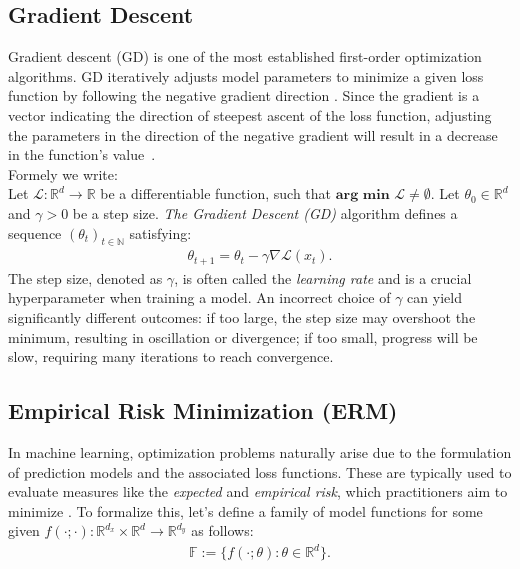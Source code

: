 \subsection{Gradient Descent}
Gradient descent (GD) is one of the most established first-order optimization algorithms. GD iteratively adjusts model
parameters to minimize a given loss function by following the negative gradient direction \cite{toussain2014gradient}.
Since the gradient is a vector indicating the direction of steepest ascent of the loss function, adjusting the parameters in the direction
of the negative gradient will result in a decrease in the function's value~\cite{toussain2014gradient}.\\
Formely we write:\\
\noindent
Let \( \mathcal{L} : \mathbb{R}^d \to \mathbb{R} \) be a differentiable function, such that \(\textbf{arg min } \mathcal{L}  \neq \emptyset \).  
Let \( \theta_0 \in \mathbb{R}^d \) and \( \gamma > 0 \) be a step size.  
\emph{The Gradient Descent (GD)} algorithm defines a sequence \( (\theta_t)_{t \in \mathbb{N}} \) satisfying:
\begin{align}
\theta_{t+1} = \theta_t - \gamma \nabla \mathcal{L}(x_t).
\end{align}
The step size, denoted as $\gamma$, is often called the \emph{learning rate} and is a crucial hyperparameter when training a model.
An incorrect choice of $\gamma$ can yield significantly different outcomes: if too large, the step size may overshoot the minimum, resulting in oscillation or divergence;
if too small, progress will be slow, requiring many iterations to reach convergence. \cite{wu2020wngrad} 


\subsection{Empirical Risk Minimization (ERM)}
\label{sec:erm}

In machine learning, optimization problems naturally arise due to the formulation of prediction models and the associated loss functions.
These are typically used to evaluate measures like the \emph{expected} and \emph{empirical risk}, which practitioners aim to minimize \cite{bottou2018optimization}.
To formalize this, let's define a family of model functions for some given \( f(\cdot; \cdot) : \mathbb{R}^{d_x} \times \mathbb{R}^d \to \mathbb{R}^{d_y} \) as follows:
\begin{align}
\mathbb{F} := \{ f(\cdot; \theta) : \theta \in \mathbb{R}^d \}.
\end{align}

